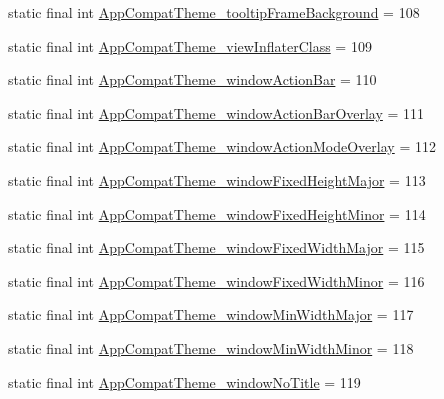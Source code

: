 \begin{DoxyCompactItemize}
\item 
static final int \mbox{\hyperlink{classcom_1_1synnapps_1_1carouselview_1_1_r_1_1styleable_ae33f88f09c8ff310c03c8daef3b8d90e}{App\+Compat\+Theme\+\_\+tooltip\+Frame\+Background}} = 108
\item 
static final int \mbox{\hyperlink{classcom_1_1synnapps_1_1carouselview_1_1_r_1_1styleable_a57ef775c72730718bab12ad4709bfcf8}{App\+Compat\+Theme\+\_\+view\+Inflater\+Class}} = 109
\item 
static final int \mbox{\hyperlink{classcom_1_1synnapps_1_1carouselview_1_1_r_1_1styleable_af8fe996eb1d17498204f27df60c18315}{App\+Compat\+Theme\+\_\+window\+Action\+Bar}} = 110
\item 
static final int \mbox{\hyperlink{classcom_1_1synnapps_1_1carouselview_1_1_r_1_1styleable_a008214685b0415e87af6bf81c90e0f11}{App\+Compat\+Theme\+\_\+window\+Action\+Bar\+Overlay}} = 111
\item 
static final int \mbox{\hyperlink{classcom_1_1synnapps_1_1carouselview_1_1_r_1_1styleable_ab2d5c95e325dc06e1c56ccfa8c345a9a}{App\+Compat\+Theme\+\_\+window\+Action\+Mode\+Overlay}} = 112
\item 
static final int \mbox{\hyperlink{classcom_1_1synnapps_1_1carouselview_1_1_r_1_1styleable_aa91f42626a42451c85df1304304967af}{App\+Compat\+Theme\+\_\+window\+Fixed\+Height\+Major}} = 113
\item 
static final int \mbox{\hyperlink{classcom_1_1synnapps_1_1carouselview_1_1_r_1_1styleable_ae3b5c9b99c9f0fa1ff5aaf9985e2a2e9}{App\+Compat\+Theme\+\_\+window\+Fixed\+Height\+Minor}} = 114
\item 
static final int \mbox{\hyperlink{classcom_1_1synnapps_1_1carouselview_1_1_r_1_1styleable_a8c4e6d1a24312e842dc269c9cf0554f6}{App\+Compat\+Theme\+\_\+window\+Fixed\+Width\+Major}} = 115
\item 
static final int \mbox{\hyperlink{classcom_1_1synnapps_1_1carouselview_1_1_r_1_1styleable_ad8bc004b2011c97f8e5e292534c2f156}{App\+Compat\+Theme\+\_\+window\+Fixed\+Width\+Minor}} = 116
\item 
static final int \mbox{\hyperlink{classcom_1_1synnapps_1_1carouselview_1_1_r_1_1styleable_ae92b75031aec9631fc0c88ed011bd263}{App\+Compat\+Theme\+\_\+window\+Min\+Width\+Major}} = 117
\item 
static final int \mbox{\hyperlink{classcom_1_1synnapps_1_1carouselview_1_1_r_1_1styleable_a506ffa8b44007b09a1b7d95ca5c8402e}{App\+Compat\+Theme\+\_\+window\+Min\+Width\+Minor}} = 118
\item 
static final int \mbox{\hyperlink{classcom_1_1synnapps_1_1carouselview_1_1_r_1_1styleable_a3ae32ae44c8fd7e17af5dff31cb7aa4a}{App\+Compat\+Theme\+\_\+window\+No\+Title}} = 119

\end{DoxyCompactItemize}
